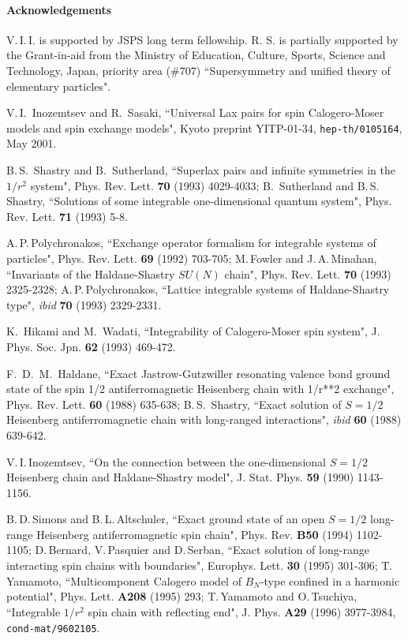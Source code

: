 \documentclass[a4paper,12pt]{article}
\begin{document}
\paragraph{Acknowledgements}
V.\,I.\,I. is supported by JSPS long term fellowship.
R. S. is partially
supported  by the Grant-in-aid from the Ministry of Education, Culture,
Sports, Science and Technology, Japan,  priority area (\#707)
``Supersymmetry and unified theory of elementary particles".
\begin{thebibliography}{99}
V.\,I.\, Inozemtsev and R.\, Sasaki,
``Universal Lax pairs for spin Calogero-Moser models and spin
exchange models", Kyoto preprint YITP-01-34, {\tt hep-th/0105164}, May 2001.


B.\,S.\, Shastry and B.\, Sutherland, ``Superlax pairs and infinite
symmetries
in the $1/r^2$ system", Phys. Rev. Lett. {\bf 70} (1993) 4029-4033;
B.\, Sutherland and B.\,S.\, Shastry, ``Solutions of some integrable
one-dimensional quantum system",
Phys. Rev. Lett. {\bf 71} (1993) 5-8.

A.\,P.\,Polychronakos, ``Exchange operator formalism for integrable systems
of
particles", Phys. Rev. Lett. {\bf 69} (1992) 703-705;
M.\,Fowler and J.\,A.\,Minahan, ``Invariants of the Haldane-Shastry $SU(N)$
chain", Phys. Rev. Lett. {\bf 70} (1993) 2325-2328;
A.\,P.\,Polychronakos,
``Lattice integrable systems of Haldane-Shastry type",
{\it ibid} {\bf 70} (1993)
2329-2331.



K.\, Hikami and   M.\, Wadati,  ``Integrability of Calogero-Moser
spin system", J. Phys. Soc. Jpn.
 {\bf 62} (1993) 469-472.

F.\, D.\, M.\,  Haldane, ``Exact Jastrow-Gutzwiller resonating
    valence bond ground state of the spin 1/2 antiferromagnetic
    Heisenberg chain with 1/r**2 exchange",
Phys. Rev. Lett. {\bf 60} (1988) 635-638; B.\,S.\,
Shastry, ``Exact solution of $S=1/2$ Heisenberg antiferromagnetic chain
with long-ranged interactions", {\it ibid} {\bf 60} (1988) 639-642.


V.\,I.\,Inozemtsev, ``On the connection between the one-dimensional
$S=1/2$ Heisenberg chain and Haldane-Shastry model",
J. Stat. Phys. {\bf 59} (1990) 1143-1156.




B.\,D.\,Simons and B.\,L.\,Altschuler,
``Exact ground state of an open $S={1/2}$ long-range Heisenberg
antiferromagnetic spin chain",
Phys. Rev. {\bf B50} (1994) 1102-1105;
D.\,Bernard, V.\,Pasquier and D.\,Serban, ``Exact solution of
 long-range interacting spin chains with boundaries",
Europhys. Lett. {\bf 30} (1995) 301-306;
T.\,Yamamoto, ``Multicomponent Calogero model of $B_N$-type confined in
a harmonic potential", Phys. Lett. {\bf A208} (1995) 293;
T.\,Yamamoto and O.\,Tsuchiya, ``Integrable $1/r^2$ spin chain with
reflecting end", J. Phys. {\bf A29} (1996) 3977-3984, {\tt
cond-mat/9602105}.


\end{thebibliography}
\end{document}
